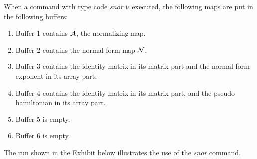      When a command with type code {\em snor } is executed, the following maps
are put in the following buffers:
\begin{enumerate}
           \item  Buffer 1 contains ${\cal A}$, the normalizing map.

           \item  Buffer 2 contains the normal form map ${\cal N}$.

		   \item  Buffer 3 contains the identity matrix in its matrix part and the
		          normal form exponent in its array part.

           \item  Buffer 4 contains the identity matrix in its matrix part,
                  and the pseudo hamiltonian in its array part.

           \item  Buffer 5 is empty.

		   \item  Buffer 6 is empty.
\end{enumerate}

The \Mary run shown in the Exhibit below illustrates the use of the {\em snor} command.

